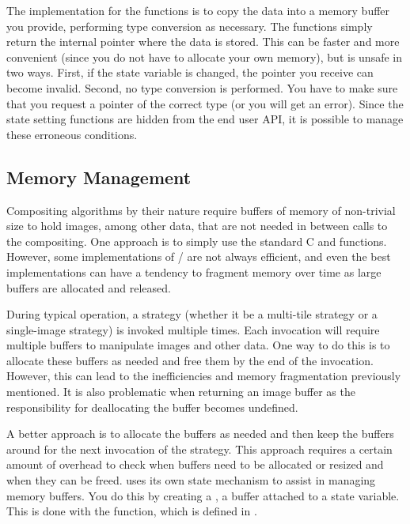 The implementation for the  functions is to copy the data
into a memory buffer you provide, performing type conversion as necessary.
The  functions simply return the internal pointer
where the data is stored.  This can be faster and more convenient (since
you do not have to allocate your own memory), but is unsafe in two ways.
First, if the state variable is changed, the pointer you receive can become
invalid.  Second, no type conversion is performed.  You have to make sure
that you request a pointer of the correct type (or you will get an error).
Since the state setting functions are hidden from the end user API, it is
possible to manage these erroneous conditions.

\subsection{Memory Management}
\label{sec:Strategies:New:Memory_Management}

Compositing algorithms by their nature require buffers of memory of
non-trivial size to hold images, among other data, that are not needed in
between calls to the compositing.  One approach is to simply use the
standard C  and  functions.
However, some implementations of
/ are not always efficient, and
even the best implementations can have a tendency to fragment memory over
time as large buffers are allocated and released.

During typical \IceT operation, a strategy (whether it be a multi-tile
strategy or a single-image strategy) is invoked multiple times.  Each
invocation will require multiple buffers to manipulate images and other
data.  One way to do this is to allocate these buffers as needed and
free them by the end of the invocation.  However, this can lead to
the inefficiencies and memory fragmentation previously mentioned.  It is
also problematic when returning an image buffer as the responsibility for
deallocating the buffer becomes undefined.

A better approach is to allocate the buffers as needed and then keep the
buffers around for the next invocation of the strategy.  This approach
requires a certain amount of overhead to check when buffers need to be
allocated or resized and when they can be freed.  \IceT uses its own state
mechanism to assist in managing memory buffers.  You do this by creating a
, a buffer attached to a state
variable.  This is done with the  function, which
is defined in .

